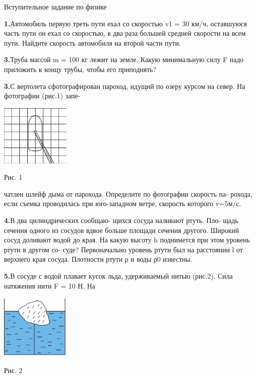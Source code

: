 \documentclass[10pt,onecolumn,a4paper]{article}
\begin{document}
\begin{multicols}{3}
\begin{center}
Вступительное задание по физике
\end{center}

\textbf{1.}Автомобиль первую треть пути ехал со скоростью v1 = 30 км/ч, оставшуюся часть пути он ехал со скоростью, в два раза большей средней скорости на всем пути. Найдите скорость автомобиля на второй части пути.

\textbf{3.}Труба массой m = 100 кг лежит на земле. Какую минимальную силу F надо приложить к концу трубы, чтобы его приподнять?

\textbf{3.}С вертолета сфотографирован пароход, идущий по озеру курсом на север. На фотографии (рис.1) запе-

\begin{center}
\includegraphics[width=0.25\textwidth]{ris1}

\caption{Рис. 1}
\end{center}

чатлен шлейф дыма от парохода. Определите по фотографии скорость па- рохода, если съемка проводилась при юго-западном ветре, скорость которого v=5м/с.

\textbf{4.}В два цилиндрических сообщаю- щихся сосуда наливают ртуть. Пло- щадь сечения одного из сосудов вдвое больше площади сечения другого. Широкий сосуд доливают водой до края. На какую высоту h поднимется при этом уровень ртути в другом со- суде? Первоначально уровень ртути был на расстоянии l от верхнего края сосуда. Плотности ртути ρ и воды ρ0 известны.

\textbf{5.}В сосуде с водой плавает кусок льда, удерживаемый нитью (рис.2). Сила натяжения нити F = 10 Н. На

\begin{center}
\includegraphics[width=0.25\textwidth]{ris2}


\caption{Рис. 2}
\end{center}

\end{multicols}
\end{document}
